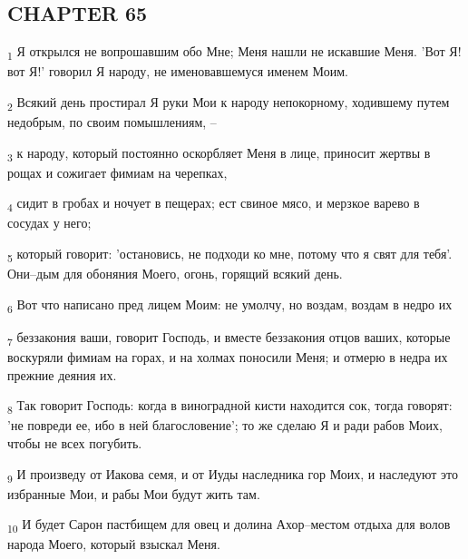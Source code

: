 \subsection{CHAPTER 65}
\begin{tcolorbox}
\textsubscript{1} Я открылся не вопрошавшим обо Мне; Меня нашли не искавшие Меня. 'Вот Я! вот Я!' говорил Я народу, не именовавшемуся именем Моим.
\end{tcolorbox}
\begin{tcolorbox}
\textsubscript{2} Всякий день простирал Я руки Мои к народу непокорному, ходившему путем недобрым, по своим помышлениям, --
\end{tcolorbox}
\begin{tcolorbox}
\textsubscript{3} к народу, который постоянно оскорбляет Меня в лице, приносит жертвы в рощах и сожигает фимиам на черепках,
\end{tcolorbox}
\begin{tcolorbox}
\textsubscript{4} сидит в гробах и ночует в пещерах; ест свиное мясо, и мерзкое варево в сосудах у него;
\end{tcolorbox}
\begin{tcolorbox}
\textsubscript{5} который говорит: 'остановись, не подходи ко мне, потому что я свят для тебя'. Они--дым для обоняния Моего, огонь, горящий всякий день.
\end{tcolorbox}
\begin{tcolorbox}
\textsubscript{6} Вот что написано пред лицем Моим: не умолчу, но воздам, воздам в недро их
\end{tcolorbox}
\begin{tcolorbox}
\textsubscript{7} беззакония ваши, говорит Господь, и вместе беззакония отцов ваших, которые воскуряли фимиам на горах, и на холмах поносили Меня; и отмерю в недра их прежние деяния их.
\end{tcolorbox}
\begin{tcolorbox}
\textsubscript{8} Так говорит Господь: когда в виноградной кисти находится сок, тогда говорят: 'не повреди ее, ибо в ней благословение'; то же сделаю Я и ради рабов Моих, чтобы не всех погубить.
\end{tcolorbox}
\begin{tcolorbox}
\textsubscript{9} И произведу от Иакова семя, и от Иуды наследника гор Моих, и наследуют это избранные Мои, и рабы Мои будут жить там.
\end{tcolorbox}
\begin{tcolorbox}
\textsubscript{10} И будет Сарон пастбищем для овец и долина Ахор--местом отдыха для волов народа Моего, который взыскал Меня.
\end{tcolorbox}
